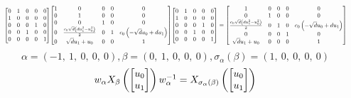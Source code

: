 \documentclass[11pt]{article}
\theoremstyle{definition}
\begin{document}
\[
\scaletoalign{\textwidth}{{\left[\begin{matrix}0 & 1 & 0 & 0 & 0\\1 & 0 & 0 & 0 & 0\\0 & 0 & 0 & 1 & 0\\0 & 0 & 1 & 0 & 0\\0 & 0 & 0 & 0 & 1\end{matrix}\right]} {\left[\begin{matrix}1 & 0 & 0 & 0 & 0\\0 & 1 & 0 & 0 & 0\\0 & 0 & 1 & 0 & 0\\0 & \frac{c_{0} \sqrt{d} \left(d u_{1}^{2} - u_{0}^{2}\right)}{2} & 0 & 1 & c_{0} \left(- \sqrt{d} u_{0} + d u_{1}\right)\\0 & \sqrt{d} u_{1} + u_{0} & 0 & 0 & 1\end{matrix}\right]} {\left[\begin{matrix}0 & 1 & 0 & 0 & 0\\1 & 0 & 0 & 0 & 0\\0 & 0 & 0 & 1 & 0\\0 & 0 & 1 & 0 & 0\\0 & 0 & 0 & 0 & 1\end{matrix}\right]} = {\left[\begin{matrix}1 & 0 & 0 & 0 & 0\\0 & 1 & 0 & 0 & 0\\\frac{c_{0} \sqrt{d} \left(d u_{1}^{2} - u_{0}^{2}\right)}{2} & 0 & 1 & 0 & c_{0} \left(- \sqrt{d} u_{0} + d u_{1}\right)\\0 & 0 & 0 & 1 & 0\\\sqrt{d} u_{1} + u_{0} & 0 & 0 & 0 & 1\end{matrix}\right]}}
\]
\[
\alpha = \left( -1, \  1, \  0, \  0, \  0\right), \beta = \left( 0, \  1, \  0, \  0, \  0\right), \sigma_{\alpha}(\beta) = \left( 1, \  0, \  0, \  0, \  0\right)
\]
\[
\scaletoalign{\textwidth}{w_{\alpha} X_{\beta}\left(\left[\begin{matrix}u_{0}\\u_{1}\end{matrix}\right]\right) w_{\alpha}^{-1} = X_{\sigma_{\alpha}\left(\beta\right)}\left(\left[\begin{matrix}u_{0}\\u_{1}\end{matrix}\right]\right)}
\]
\end{document}
